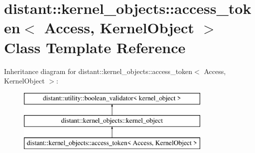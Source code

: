 \hypertarget{classdistant_1_1kernel__objects_1_1access__token}{}\section{distant\+:\+:kernel\+\_\+objects\+:\+:access\+\_\+token$<$ Access, Kernel\+Object $>$ Class Template Reference}
\label{classdistant_1_1kernel__objects_1_1access__token}
Inheritance diagram for distant\+:\+:kernel\+\_\+objects\+:\+:access\+\_\+token$<$ Access, Kernel\+Object $>$\+:\begin{figure}[H]
\begin{center}
\leavevmode
\includegraphics[height=3.000000cm]{classdistant_1_1kernel__objects_1_1access__token}
\end{center}
\end{figure}

